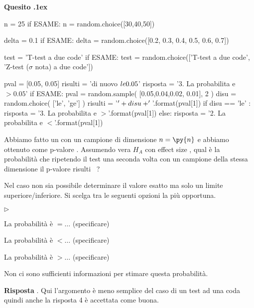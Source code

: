 \documentclass[11pt,twoside,a4paper]{article}
\newcommand{\mylabel}[1]{#1\hfill}
\renewenvironment{itemize}
  {\begin{list}{$\triangleright$}{%
   \setlength{\parskip}{0mm}
   \setlength{\topsep}{.4\baselineskip}
   \setlength{\rightmargin}{0mm}
   \setlength{\listparindent}{0mm}
   \setlength{\itemindent}{0mm}
   \setlength{\labelwidth}{2ex}
   \setlength{\itemsep}{.4\baselineskip}
   \setlength{\parsep}{0mm}
   \setlength{\partopsep}{0mm}
   \setlength{\labelsep}{1ex}
   \setlength{\leftmargin}{\labelwidth+\labelsep}
   \let\makelabel\mylabel}}{%
   \end{list}\vspace*{-1.3mm}}
\newcounter{quesito}
\newenvironment{question}{\bigskip\addtocounter{quesito}{1}\par\textbf{Quesito \thequesito.\kern1ex}}{\vspace{\parskip}}
\newenvironment{answer}{\par\textbf{Risposta\quad}}{\vspace{\parskip}}
\begin{document}
\begin{question} %
\begin{pycode}
n = 25
if ESAME: n = random.choice([30,40,50])

delta = 0.1
if ESAME: delta = random.choice([0.2, 0.3, 0.4, 0.5, 0.6, 0.7])

test = 'T-test a due code'
if ESAME: test = random.choice(['T-test a due code', 'Z-test ($\sigma$ nota) a due code'])

pval = [0.05, 0.05]
risulti = 'di nuovo $\\le 0.05$'
risposta = '3. La probabilita e $>0.05$'
if ESAME: 
   pval = random.sample( [0.05,0.04,0.02, 0.01], 2 )
   disu = random.choice( ['le', 'ge'] ) 
   risulti = '$\\' + disu + '{}$'.format(pval[1])
   if disu == 'le' :
      risposta = '3. La probabilita e $>{}$'.format(pval[1])
   else:
      risposta = '2. La probabilita e $<{}$'.format(pval[1])
\end{pycode}
Abbiamo fatto un  con un campione di dimensione $n=\py{n}$ e abbiamo ottenuto come p-valore .
Assumendo vera $H_A$ con effect size , qual è la probabilità che ripetendo il test una seconda volta con un campione della stessa dimensione il p-valore risulti ~?

Nel caso non sia possibile determinare il valore esatto ma solo un limite superiore/inferiore. Si scelga tra le seguenti opzioni la più opportuna.
\begin{itemize}
\item[1.] La probabilità è $=\dots$ (specificare)
\item[2.] La probabilità è $<\dots$ (specificare)
\item[3.] La probabilità è $>\dots$ (specificare)
\item[4.] Non ci sono sufficienti informazioni per stimare questa probabilità.
\end{itemize}
\begin{answer}
{\color{blue}.} Qui l'argomento è meno semplice del caso di un test ad una coda quindi anche la risposta 4 è accettata come buona.
\end{answer}
\end{question}
\end{document}
